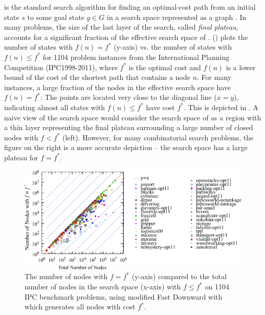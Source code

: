 \astar is the standard search
algorithm for finding an optimal-cost path from an initial state $s$ to
some goal state $g \in G$ in a search space represented as a graph
\cite{hart1968formal}.
In many problems, the size of the last layer of the search, called
\emph{final plateau}, accounts for a significant fraction of the
effective search space of \astar.  
() plots the number of states with $f(n) = f^*$
(y-axis) vs. the number of states with $f(n) \leq f^*$ for 1104 problem
instances from the International Planning Competition (IPC1998-2011),
where $f^*$ is the optimal cost and $f(n)$ is a lower bound of the cost of the shortest path
that contains a node $n$.  For many instances, a large
fraction of the nodes in the effective search space have $f(n)=f^*$:
The points are located very close to the diagonal line
($x=y$), indicating almost all states with $f(n) \leq f^*$ have cost $f^*$.
This is depicted in . 
A naive view of the search space would consider the search space of \astar as a region with a thin layer representing the  final plateau surrounding a large number of closed nodes with $f<f^*$ (left).
However, for many combinatorial search problems, 
the figure on the right is a more accurate depiction -- the  search space has a large plateau 
for $f=f^*$.

\begin{figure}[htbp]
  \centering
  \includegraphics{tables/aaai16-frontier/aaai16prelim3/lmcut_frontier_noh-front.pdf}
 \caption{
 The number of nodes with $f=f^*$ (y-axis) compared to the
 total number of nodes in the search space (x-axis) with $f\leq f^*$ on 1104 IPC benchmark problems,
  using modified Fast Downward with \lmcut which 
  generates all nodes with cost $f^*$.
  }
 \label{fig:plateau-noh}
\end{figure}

